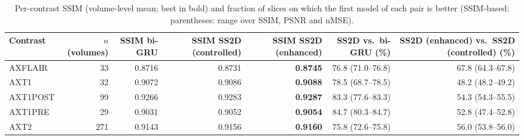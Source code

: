 \begin{table}[ht]
\centering
\caption{Per-contrast SSIM (volume-level mean; best in bold) and fraction of slices on which the first model of each pair is better (SSIM-based; parentheses: range over SSIM, PSNR and nMSE).}
\label{tab:contrast-volume}
\begin{tabular}{lrrrrrr}
\toprule
Contrast & $n$ (volumes) & SSIM bi-GRU & SSIM SS2D (controlled) & SSIM SS2D (enhanced) & SS2D vs.\ bi-GRU (\%) & SS2D (enhanced) vs.\ SS2D (controlled) (\%) \\
\midrule
AXFLAIR & 33 & 0.8716 & 0.8731 & \textbf{0.8745} & 76.8 (71.0–76.8) & 67.8 (64.3–67.8) \\
AXT1 & 32 & 0.9072 & 0.9086 & \textbf{0.9088} & 78.5 (68.7–78.5) & 48.2 (48.2–49.2) \\
AXT1POST & 99 & 0.9266 & 0.9283 & \textbf{0.9287} & 83.3 (77.6–83.3) & 54.3 (54.3–55.5) \\
AXT1PRE & 29 & 0.9031 & 0.9052 & \textbf{0.9054} & 84.7 (80.3–84.7) & 52.8 (47.4–52.8) \\
AXT2 & 271 & 0.9143 & 0.9156 & \textbf{0.9160} & 75.8 (72.6–75.8) & 56.0 (53.8–56.0) \\
\bottomrule
\end{tabular}
\end{table}
